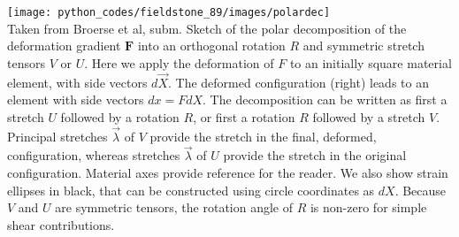 \begin{center}
\texttt{[image: python\_codes/fieldstone\_89/images/polardec]}\\
{\captionfont Taken from Broerse et al, subm. 
Sketch of the polar decomposition of the deformation gradient ${\bm F}$ into an orthogonal
rotation $R$ and symmetric stretch tensors $V$ or $U$. Here we apply the deformation of $F$ to an
initially square material element, with side vectors $d\vec{X}$. 
The deformed configuration (right)
leads to an element with side vectors $dx = FdX$. 
The decomposition can be written as first
a stretch $U$ followed by a rotation $R$, or first a rotation $R$ followed by a stretch $V$. 
Principal stretches $\vec\lambda$ of $V$ provide the stretch in the final, deformed, configuration, 
whereas stretches $\vec\lambda$ of $U$ provide the stretch in the original configuration. 
Material axes provide reference for the reader. 
We also show strain ellipses in black, that can be constructed using circle coordinates
as $dX$. Because $V$ and $U$ are symmetric tensors, the rotation angle of $R$ is non-zero for simple
shear contributions.}
\end{center}






